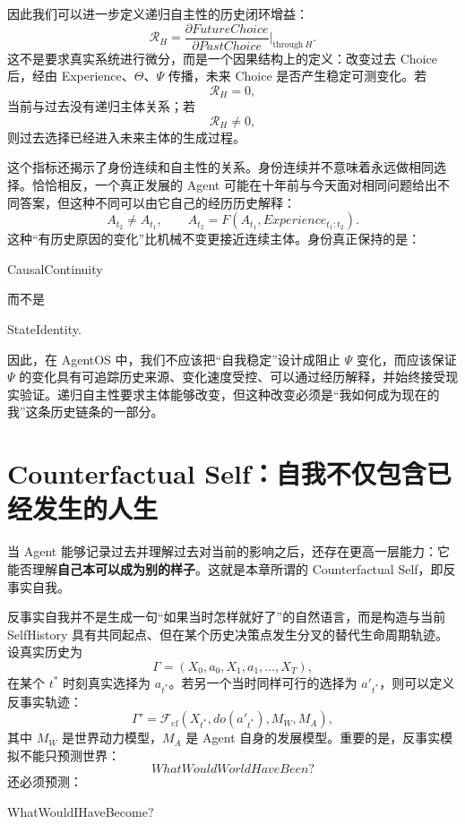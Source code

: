 因此我们可以进一步定义递归自主性的历史闭环增益：
\[
\mathcal R_H
=
\frac{
\partial FutureChoice
}{
\partial PastChoice
}
\Bigg|_{\mathrm{through}\ H}.
\]
这不是要求真实系统进行微分，而是一个因果结构上的定义：改变过去 Choice 后，经由 Experience、$\Theta$、$\Psi$ 传播，未来 Choice 是否产生稳定可测变化。若
\[
\mathcal R_H=0,
\]
当前与过去没有递归主体关系；若
\[
\mathcal R_H\neq0,
\]
则过去选择已经进入未来主体的生成过程。

这个指标还揭示了身份连续和自主性的关系。身份连续并不意味着永远做相同选择。恰恰相反，一个真正发展的 Agent 可能在十年前与今天面对相同问题给出不同答案，但这种不同可以由它自己的经历历史解释：
\[
A_{t_2}
\neq
A_{t_1},
\qquad
A_{t_2}
=
F(A_{t_1},Experience_{t_1:t_2}).
\]
这种“有历史原因的变化”比机械不变更接近连续主体。身份真正保持的是：
\begin{statementbox}
CausalContinuity
\end{statementbox}
而不是
\begin{statementbox}
StateIdentity.
\end{statementbox}

因此，在 AgentOS 中，我们不应该把“自我稳定”设计成阻止 $\Psi$ 变化，而应该保证 $\Psi$ 的变化具有可追踪历史来源、变化速度受控、可以通过经历解释，并始终接受现实验证。递归自主性要求主体能够改变，但这种改变必须是“我如何成为现在的我”这条历史链条的一部分。

\section{Counterfactual Self：自我不仅包含已经发生的人生}

当 Agent 能够记录过去并理解过去对当前的影响之后，还存在更高一层能力：它能否理解\textbf{自己本可以成为别的样子}。这就是本章所谓的 Counterfactual Self，即反事实自我。

反事实自我并不是生成一句“如果当时怎样就好了”的自然语言，而是构造与当前 SelfHistory 具有共同起点、但在某个历史决策点发生分叉的替代生命周期轨迹。设真实历史为
\[
\Gamma
=
(X_0,a_0,X_1,a_1,\ldots,X_T),
\]
在某个 $t^\ast$ 时刻真实选择为 $a_{t^\ast}$。若另一个当时同样可行的选择为 $a'_{t^\ast}$，则可以定义反事实轨迹：
\[
\Gamma'
=
\mathcal F_{\mathrm{cf}}
\left(
X_{t^\ast},
do(a'_{t^\ast}),
M_W,
M_A
\right),
\]
其中 $M_W$ 是世界动力模型，$M_A$ 是 Agent 自身的发展模型。重要的是，反事实模拟不能只预测世界：
\[
WhatWouldWorldHaveBeen?
\]
还必须预测：
\begin{statementbox}
WhatWouldIHaveBecome?
\end{statementbox}

